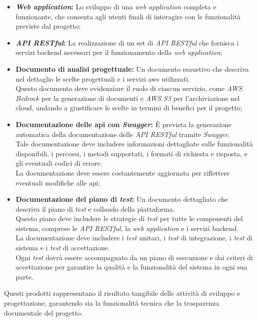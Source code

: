 \begin{itemize}
    \item \textbf{\textit{Web application}:} Lo sviluppo di una \textit{web application} completa e funzionante, che consenta agli utenti finali di interagire con le funzionalità previste dal progetto;
    \item \textbf{\textit{API RESTful}:} La realizzazione di un set di \textit{API RESTful} che fornisca i servizi \gls{backend} necessari per il funzionamento della \textit{web application};
    \item \textbf{Documento di analisi progettuale:} Un documento esaustivo che descriva nel dettaglio le scelte progettuali e i servizi \gls{aws} utilizzati.\\
    Questo documento deve evidenziare il ruolo di ciascun servizio, come \textit{AWS Bedrock} per la generazione di documenti e \textit{AWS S3} per l’archiviazione nel cloud, 
    andando a giustificare le scelte in termini di benefici per il progetto;
    \item \textbf{Documentazione delle \gls{api} con \textit{Swagger}:} È prevista la generazione automatica della documentazione delle \textit{API RESTful} tramite \textit{Swagger}. \\
    Tale documentazione deve includere informazioni dettagliate sulle funzionalità disponibili, i percorsi, i metodi supportati, i formati di richiesta e risposta, e gli eventuali codici di errore. \\
    La documentazione deve essere costantemente aggiornata per riflettere eventuali modifiche alle \gls{api};
    \item \textbf{Documentazione del piano di \textit{test}:} Un documento dettagliato che descriva il piano di \textit{test} e collaudo della piattaforma. \\
    Questo piano deve includere le strategie di \textit{test} per tutte le componenti del sistema, comprese le \textit{API RESTful}, la \textit{web application} e i servizi \gls{backend}.\\
    La documentazione deve includere i \textit{test} unitari, i \textit{test} di integrazione, i \textit{test} di sistema e i \textit{test} di accettazione. \\
    Ogni \textit{test} dovrà essere accompagnato da un piano di esecuzione e dai criteri di accettazione per garantire la qualità e la funzionalità del sistema in ogni sua parte.\\
\end{itemize}

\noindent Questi prodotti rappresentano il risultato tangibile delle attività di sviluppo e progettazione, garantendo sia la funzionalità tecnica che la trasparenza documentale del progetto.

